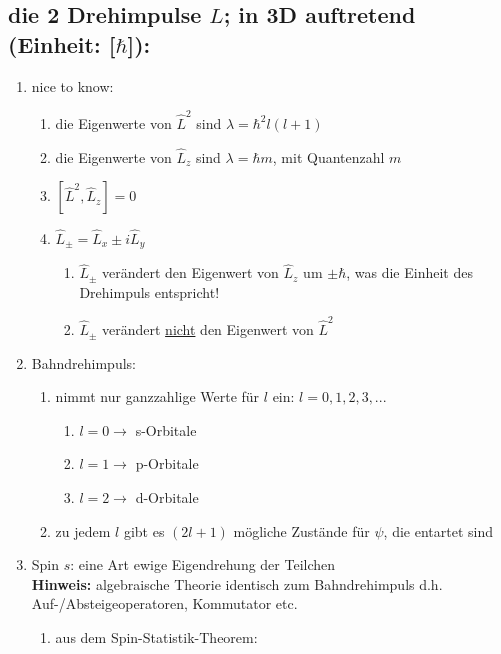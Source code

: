 \subsection{die 2 Drehimpulse $L$; in 3D auftretend (\textbf{Einheit}: [$\hbar$]):} \label{Drehimpuls}
\begin{enumerate}
    \item nice to know:
    \begin{enumerate}
        \item die Eigenwerte von $\hat{L}^2$ sind $\lambda=\hbar^2 l (l+1)$
        \item die Eigenwerte von $\hat{L}_z$ sind $\lambda=\hbar m$, mit Quantenzahl $m$
        \item $[\hat{L}^2,\hat{L}_z]=0$
        \item $\hat{L}_\pm=\hat{L}_x \pm i\hat{L}_y$
        \begin{enumerate}
            \item $\hat{L}_\pm$ verändert den Eigenwert von $\hat{L}_z$ um $\pm \hbar$, was die Einheit des Drehimpuls entspricht!
            \item $\hat{L}_\pm$ verändert \underline{nicht} den Eigenwert von $\hat{L}^2$
        \end{enumerate}
    \end{enumerate}
    \item Bahndrehimpuls:
    \begin{enumerate}
        \item nimmt nur ganzzahlige Werte für $l$ ein: $l=0,1,2,3,...$
        \begin{enumerate}
            \item $l=0\rightarrow$ s-Orbitale
            \item $l=1\rightarrow$ p-Orbitale
            \item $l=2\rightarrow$ d-Orbitale
        \end{enumerate}
        \item zu jedem $l$ gibt es $(2l+1)$ mögliche Zustände für $\psi$, die entartet sind \label{FormVonPsi}
    \end{enumerate}
    \item Spin $s$: eine Art ewige Eigendrehung der Teilchen \\
    \textbf{Hinweis:} algebraische Theorie identisch zum Bahndrehimpuls d.h. Auf-/Absteigeoperatoren, Kommutator etc.
\begin{enumerate}
    \item aus dem Spin-Statistik-Theorem:
\begin{enumerate}

\end{enumerate}
\end{enumerate}
\end{enumerate}
